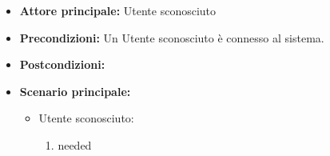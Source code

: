 \label{usecase:Ordine condiviso}
\begin{itemize}
\item \textbf{Attore principale:} Utente sconosciuto
\item \textbf{Precondizioni:}
Un Utente sconosciuto è connesso al sistema.
\item \textbf{Postcondizioni:}
\item \textbf{Scenario principale:}
\begin{itemize}
\item Utente sconosciuto:
\begin{enumerate}
\item needed
\end{enumerate}
\end{itemize}

\end{itemize}